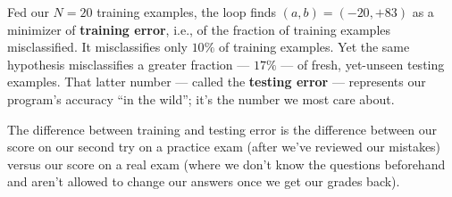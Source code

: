 
  Fed our $N=20$ training examples, the loop finds
  $(a,b)=(-20,+83)$ as a minimizer of \textbf{training error}, i.e.,
  of the fraction of training examples misclassified.  It misclassifies
  only $10\%$ of training examples. Yet the same
  hypothesis misclassifies a greater fraction --- $17\%$ --- of fresh,
  yet-unseen testing examples.
  That latter number --- called the \textbf{testing error} --- represents
  our program's accuracy ``in the wild''; it's the number we most care
  about.

  The difference between training and testing error is the
  difference between our score on our second try on a practice exam (after we've reviewed
  our mistakes) versus our score on a real
  exam (where we don't know the questions beforehand and aren't allowed
  to change our answers once we get our grades back).




